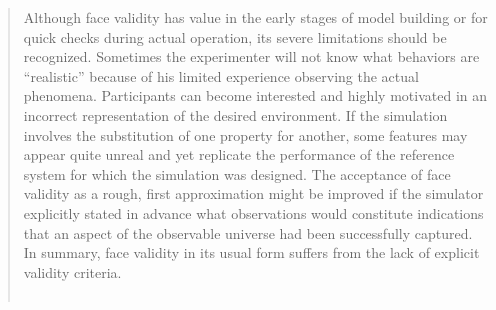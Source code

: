 \begin{quotation}
	\noindent \og
	Although face validity has value in the early stages of model building or for quick checks during actual operation, its severe limitations should be recognized.
	Sometimes the experimenter will not know what behaviors are ``realistic'' because of his limited experience observing the actual phenomena.
	Participants can become interested and highly motivated in an incorrect representation of the desired environment.
	If the simulation involves the substitution of one property for another, some features may appear quite unreal and yet replicate the performance of the reference system for which the simulation was designed.
	The acceptance of face validity as a rough, first approximation might be improved if the simulator explicitly stated in advance what observations would constitute indications that an aspect of the observable universe had been successfully captured.
	In summary, face validity in its usual form suffers from the lack of explicit validity criteria.
	\fg{}\\
	\mbox{}~ \hfill \textcite[222]{hermann_validation_1967}
\end{quotation}


